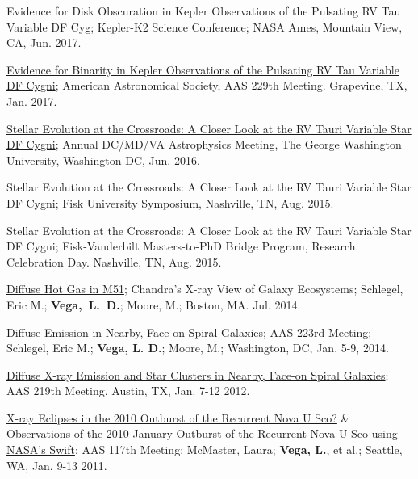 \documentclass[letter,11pt]{article}
\begin{document}
\begin{etaremune}
\item Evidence for Disk Obscuration in Kepler Observations of the Pulsating RV Tau Variable DF Cyg; Kepler-K2 Science Conference; NASA Ames, Mountain View, CA, Jun. 2017.

\item \href{http://adsabs.harvard.edu/abs/2017AAS...22915210V}{Evidence for Binarity in Kepler Observations of the Pulsating RV Tau Variable DF Cygni}; American  Astronomical  Society,  AAS  229th  Meeting. Grapevine, TX, Jan. 2017.

\item \href{https://physics.columbian.gwu.edu/sites/g/files/zaxdzs1976/f/downloads/Astro2016_Conf_program_final.pdf}{Stellar  Evolution at the Crossroads: A Closer Look at the RV Tauri Variable Star DF Cygni};  Annual DC/MD/VA Astrophysics Meeting, The George Washington University, Washington DC, Jun. 2016.

\item Stellar Evolution at the Crossroads: A Closer Look at the RV Tauri Variable Star DF Cygni; Fisk University Symposium, Nashville, TN, Aug. 2015. 

\item Stellar Evolution at the Crossroads: A Closer Look at the RV Tauri Variable Star DF Cygni; Fisk-Vanderbilt Masters-to-PhD Bridge Program, Research Celebration Day. Nashville, TN, Aug. 2015. 

\item \href{http://adsabs.harvard.edu/abs/2014xvge.confE..38S}{Diffuse Hot Gas in M51}; Chandra’s X-ray View of Galaxy Ecosystems; Schlegel, Eric M.; \textbf{Vega,~L.~D.}; Moore, M.; Boston, MA. Jul. 2014.

\item \href{http://adsabs.harvard.edu/abs/2014AAS...22345311S}{Diffuse Emission in Nearby, Face-on Spiral Galaxies}; AAS 223rd Meeting; Schlegel, Eric M.; \textbf{Vega, L. D.}; Moore, M.; Washington, DC, Jan. 5-9, 2014.

\item \href{http://adsabs.harvard.edu/abs/2012AAS...21934630V}{Diffuse X-ray Emission and Star Clusters in Nearby, Face-on Spiral Galaxies}; AAS 219th Meeting. Austin, TX, Jan. 7-12 2012.

\item \href{http://adsabs.harvard.edu/abs/2011AAS...21733813M}{X-ray Eclipses in the 2010 Outburst of the Recurrent Nova U Sco?} \& \href{http://adsabs.harvard.edu/abs/2011AAS...21733812M}{Observations of the 2010 January Outburst of the Recurrent Nova U Sco using NASA's Swift}; AAS 117th Meeting; McMaster, Laura; \textbf{Vega, L.}, et al.; Seattle, WA, Jan. 9-13 2011. 



\end{etaremune}
\end{document}
